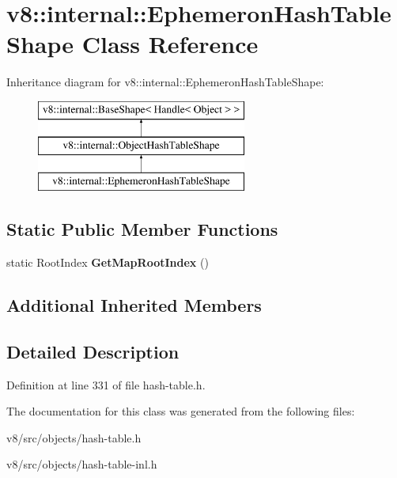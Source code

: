 \hypertarget{classv8_1_1internal_1_1EphemeronHashTableShape}{}\section{v8\+:\+:internal\+:\+:Ephemeron\+Hash\+Table\+Shape Class Reference}
\label{classv8_1_1internal_1_1EphemeronHashTableShape}
Inheritance diagram for v8\+:\+:internal\+:\+:Ephemeron\+Hash\+Table\+Shape\+:\begin{figure}[H]
\begin{center}
\leavevmode
\includegraphics[height=3.000000cm]{classv8_1_1internal_1_1EphemeronHashTableShape}
\end{center}
\end{figure}
\subsection*{Static Public Member Functions}
\begin{DoxyCompactItemize}
\item 
\mbox{\label{classv8_1_1internal_1_1EphemeronHashTableShape_a33d8f6af313317be87249a498582d6a9}} 
static Root\+Index {\bfseries Get\+Map\+Root\+Index} ()
\end{DoxyCompactItemize}
\subsection*{Additional Inherited Members}


\subsection{Detailed Description}


Definition at line 331 of file hash-\/table.\+h.



The documentation for this class was generated from the following files\+:\begin{DoxyCompactItemize}
\item 
v8/src/objects/hash-\/table.\+h\item 
v8/src/objects/hash-\/table-\/inl.\+h\end{DoxyCompactItemize}
